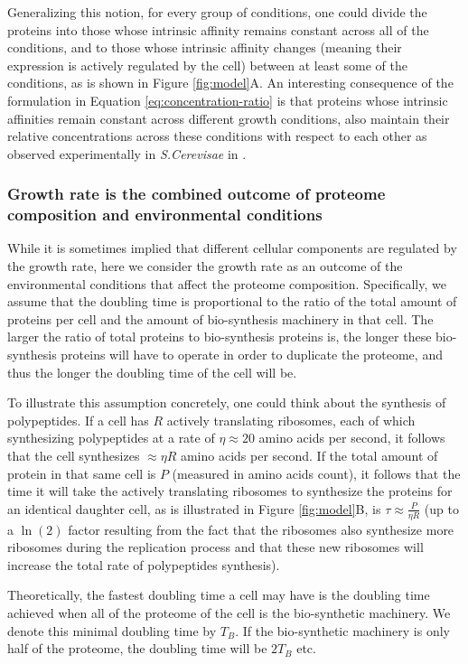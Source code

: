 \documentclass[a4paper]{article}
\begin{document}
Generalizing this notion, for every group of conditions, one could divide the proteins into those whose intrinsic affinity remains constant across all of the conditions, and to those whose intrinsic affinity changes (meaning their expression is actively regulated by the cell) between at least some of the conditions, as is shown in Figure \ref{fig:model}A.
An interesting consequence of the formulation in Equation \ref{eq:concentration-ratio} is that proteins whose intrinsic affinities remain constant across different growth conditions, also maintain their relative concentrations across these conditions with respect to each other as observed experimentally in \emph{S.Cerevisae} in \cite{Keren2013}.

\subsubsection{Growth rate is the combined outcome of proteome composition and environmental conditions}
While it is sometimes implied that different cellular components are regulated by the growth rate, here we consider the growth rate as an outcome of the environmental conditions that affect the proteome composition.
Specifically, we assume that the doubling time is proportional to the ratio of the total amount of proteins per cell and the amount of bio-synthesis machinery in that cell.
The larger the ratio of total proteins to bio-synthesis proteins is, the longer these bio-synthesis proteins will have to operate in order to duplicate the proteome, and thus the longer the doubling time of the cell will be.

To illustrate this assumption concretely, one could think about the synthesis of polypeptides.
If a cell has $R$ actively translating ribosomes, each of which synthesizing polypeptides at a rate of $\eta \approx 20$ amino acids per second, it follows that the cell synthesizes $\approx \eta R$ amino acids per second.
If the total amount of protein in that same cell is $P$ (measured in amino acids count), it follows that the time it will take the actively translating ribosomes to synthesize the proteins for an identical daughter cell, as is illustrated in Figure \ref{fig:model}B, is $\tau \approx \frac{P}{\eta R}$ (up to a $\ln(2)$ factor resulting from the fact that the ribosomes also synthesize more ribosomes during the replication process and that these new ribosomes will increase the total rate of polypeptides synthesis).


Theoretically, the fastest doubling time a cell may have is the doubling time achieved when all of the proteome of the cell is the bio-synthetic machinery.
We denote this minimal doubling time by $T_B$.
If the bio-synthetic machinery is only half of the proteome, the doubling time will be $2T_B$ etc.
\end{document}
